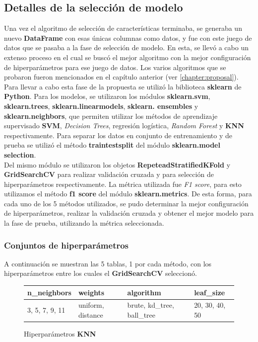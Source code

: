 	\subsection{Detalles de la selección de modelo}
		Una vez el algoritmo de selección de características terminaba, se generaba un nuevo \textbf{DataFrame} con esas únicas columnas como datos,
		y fue con este juego de datos que se pasaba a la fase de selección de modelo. En esta, se llevó a cabo un extenso proceso en el cual se buscó
		el mejor algoritmo con la mejor configuración de hiperparámetros para ese juego de datos. Los varios algoritmos que se probaron fueron
		mencionados en el capítulo anterior (ver \ref {chapter:proposal}).\\
		\indent Para llevar a cabo esta fase de la propuesta se utilizó la biblioteca \textbf{sklearn} de \textbf{Python}.
		Para los modelos, se utilizaron los módulos \textbf{sklearn.svm}, \textbf{sklearn.trees}, \textbf{sklearn.linear\textunderscore models},
		\textbf{sklearn. ensembles} y \textbf{sklearn.neighbors}, que permiten utilizar los métodos de aprendizaje supervisado \textbf{SVM}, \emph
		{Decision Trees}, regresión logística, \emph{Random Forest} y \textbf{KNN} respectivamente. Para separar los datos en conjunto de entrenamiento
		y de prueba se utilizó el método \textbf{train\textunderscore test\textunderscore split} del módulo \textbf{sklearn.model\textunderscore
		selection}.\\
		\indent Del mismo módulo se utilizaron los objetos \textbf {RepeteadStratifiedKFold} y \textbf{GridSearchCV} para realizar validación cruzada y
		para selección de hiperparámetros respectivamente. La métrica utilizada fue \emph{F1 score}, para esto utilizamos el método \textbf{f1\textunderscore
		score} del módulo \textbf{sklearn.metrics}. De esta forma, para cada uno de los 5 métodos utilizados, se pudo determinar la mejor configuración
		de hiperparámetros, realizar la validación cruzada y obtener el mejor modelo para la fase de prueba, utilizando la métrica seleccionada.\\

		\subsubsection{Conjuntos de hiperparámetros}
			A continuación se muestran las 5 tablas, 1 por cada método, con los hiperparámetros entre los cuales el \textbf{GridSearchCV} seleccionó.\\

			\begin{figure}[ht!]
				\centering
				\begin{tabular}{llll}
					\toprule
						   n\_neighbors &            weights &                  algorithm &       leaf\_size \\
					\midrule
					 3, 5, 7, 9, 11 &  uniform, distance &  brute, kd\_tree, ball\_tree &  20, 30, 40, 50 \\
					\bottomrule
				\end{tabular}
				\caption{Hiperparámetros \textbf{KNN}}
				\label{table:7}
			\end{figure}

